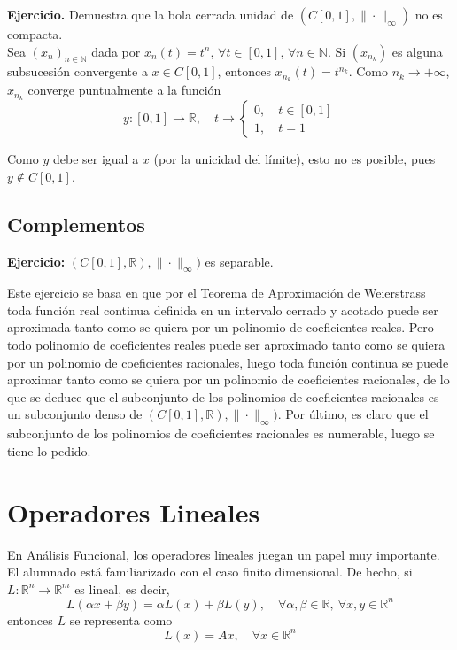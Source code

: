 \documentclass{article}
\begin{document}
\textbf{Ejercicio.} Demuestra que la bola cerrada unidad de $(C[0,1],\|\cdot\|_\infty)$ no es compacta.\\

Sea $(x_n)_{n\in\mathbb{N}}$ dada por $x_n(t)=t^n$, $\forall t\in[0,1]$, $\forall n\in\mathbb{N}$. Si $(x_{n_k})$ es alguna subsucesión convergente a $x\in C[0,1]$, entonces $x_{n_k}(t)=t^{n_k}$. Como $n_k\to +\infty$, $x_{n_k}$ converge puntualmente a la función
\begin{equation*}
y:[0,1]\rightarrow \mathbb{R},\quad t\rightarrow \left\lbrace \begin{array}{c}
0,\quad t\in [0,1]\\
1,\quad t=1
\end{array}\right.
\end{equation*}

Como $y$ debe ser igual a $x$ (por la unicidad del límite), esto no es posible, pues $y\notin C[0,1]$.

\subsection{Complementos}
\textbf{Ejercicio:} $(C[0,1],\mathbb{R}),\|\cdot\|_{\infty})$ es separable.

Este ejercicio se basa en que por el Teorema de Aproximación de Weierstrass toda función real continua definida en un intervalo cerrado y acotado puede ser aproximada tanto como se quiera por un polinomio de coeficientes reales. Pero todo polinomio de coeficientes reales puede ser aproximado tanto como se quiera por un polinomio de coeficientes racionales, luego toda función continua se puede aproximar tanto como se quiera por un polinomio de coeficientes racionales, de lo que se deduce que el subconjunto de los polinomios de coeficientes racionales es un subconjunto denso de $(C[0,1],\mathbb{R}),\|\cdot\|_{\infty})$. Por último, es claro que el subconjunto de los polinomios de coeficientes racionales es numerable, luego se tiene lo pedido.

\section{Operadores Lineales}
En Análisis Funcional, los operadores lineales juegan un papel muy importante. El alumnado está familiarizado con el caso finito dimensional. De hecho, si $L:\mathbb{R}^n\rightarrow \mathbb{R}^m$ es lineal, es decir,
\begin{equation}
L(\alpha x+\beta y)=\alpha L(x)+\beta L(y),\quad \forall \alpha,\beta\in\mathbb{R},\:\forall x,y\in\mathbb{R}^n
\end{equation}
entonces $L$ se representa como 
\begin{equation}
L(x)=Ax,\quad\forall x\in\mathbb{R}^n
\end{equation}
\end{document}
